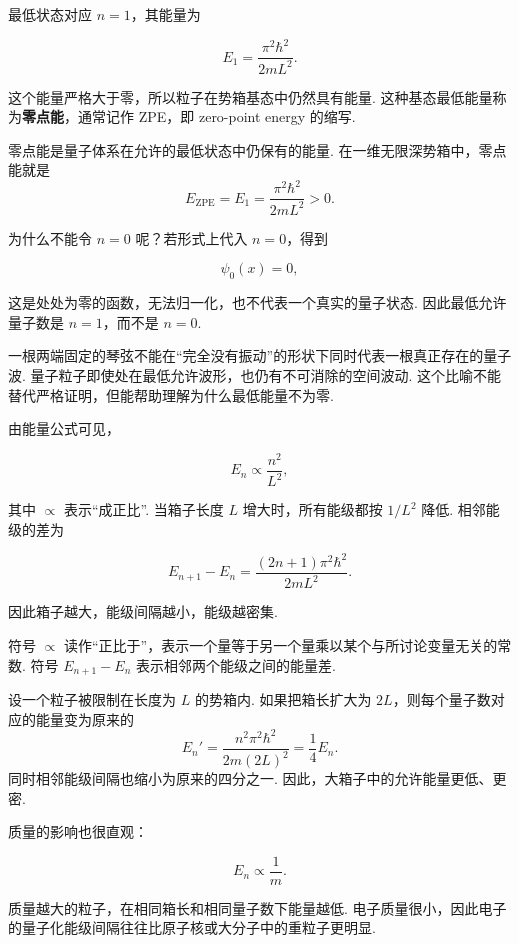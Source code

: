 \documentclass[UTF8,11pt,a4paper,openany]{ctexbook}
\newcommand{\term}[1]{\textbf{#1}}
\begin{document}
最低状态对应 $n=1$，其能量为

\[
E_1=\frac{\pi^2\hbar^2}{2mL^2}.
\]

这个能量严格大于零，所以粒子在势箱基态中仍然具有能量. 这种基态最低能量称为\term{零点能}，通常记作 ZPE，即 zero-point energy 的缩写. 

\begin{definitionbox}
零点能是量子体系在允许的最低状态中仍保有的能量. 在一维无限深势箱中，零点能就是
\[
E_{\mathrm{ZPE}}=E_1=\frac{\pi^2\hbar^2}{2mL^2}>0.
\]
\end{definitionbox}

为什么不能令 $n=0$ 呢？若形式上代入 $n=0$，得到

\[
\psi_0(x)=0,
\]

这是处处为零的函数，无法归一化，也不代表一个真实的量子状态. 因此最低允许量子数是 $n=1$，而不是 $n=0$. 

\begin{analogybox}
一根两端固定的琴弦不能在“完全没有振动”的形状下同时代表一根真正存在的量子波. 量子粒子即使处在最低允许波形，也仍有不可消除的空间波动. 这个比喻不能替代严格证明，但能帮助理解为什么最低能量不为零. 
\end{analogybox}

由能量公式可见，

\[
E_n\propto\frac{n^2}{L^2},
\]

其中 $\propto$ 表示“成正比”. 当箱子长度 $L$ 增大时，所有能级都按 $1/L^2$ 降低. 相邻能级的差为

\[
E_{n+1}-E_n
=\frac{(2n+1)\pi^2\hbar^2}{2mL^2}.
\]

因此箱子越大，能级间隔越小，能级越密集. 

\begin{notationbox}
符号 $\propto$ 读作“正比于”，表示一个量等于另一个量乘以某个与所讨论变量无关的常数. 符号 $E_{n+1}-E_n$ 表示相邻两个能级之间的能量差. 
\end{notationbox}

\begin{examplebox}
设一个粒子被限制在长度为 $L$ 的势箱内. 如果把箱长扩大为 $2L$，则每个量子数对应的能量变为原来的
\[
E_n'=\frac{n^2\pi^2\hbar^2}{2m(2L)^2}
=\frac14E_n.
\]
同时相邻能级间隔也缩小为原来的四分之一. 因此，大箱子中的允许能量更低、更密. 
\end{examplebox}

质量的影响也很直观：

\[
E_n\propto\frac{1}{m}.
\]

质量越大的粒子，在相同箱长和相同量子数下能量越低. 电子质量很小，因此电子的量子化能级间隔往往比原子核或大分子中的重粒子更明显. 
\end{document}
